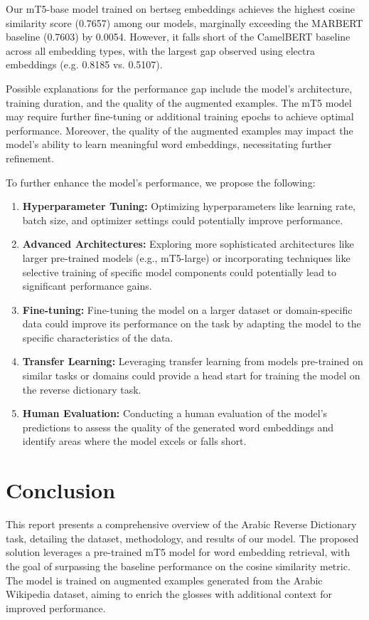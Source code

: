 \documentclass[15pt]{article}
\begin{document}
Our mT5-base model trained on bertseg embeddings achieves the highest cosine similarity score (0.7657) among our models, marginally exceeding the MARBERT baseline (0.7603) by 0.0054. However, it falls short of the CamelBERT baseline across all embedding types, with the largest gap observed using electra embeddings (e.g. 0.8185 vs. 0.5107).

Possible explanations for the performance gap include the model's architecture, training duration, and the quality of the augmented examples. The mT5 model may require further fine-tuning or additional training epochs to achieve optimal performance. Moreover, the quality of the augmented examples may impact the model's ability to learn meaningful word embeddings, necessitating further refinement.

To further enhance the model's performance, we propose the following:
\begin{enumerate}
    \item \textbf{Hyperparameter Tuning:} Optimizing hyperparameters like learning rate, batch size, and optimizer settings could potentially improve performance.
    \item \textbf{Advanced Architectures:} Exploring more sophisticated architectures like larger pre-trained models (e.g., mT5-large) or incorporating techniques like selective training of specific model components could potentially lead to significant performance gains.
    \item \textbf{Fine-tuning:} Fine-tuning the model on a larger dataset or domain-specific data could improve its performance on the task by adapting the model to the specific characteristics of the data.
    \item \textbf{Transfer Learning:} Leveraging transfer learning from models pre-trained on similar tasks or domains could provide a head start for training the model on the reverse dictionary task.
    \item \textbf{Human Evaluation:} Conducting a human evaluation of the model's predictions to assess the quality of the generated word embeddings and identify areas where the model excels or falls short.
\end{enumerate} 

\section*{Conclusion}

This report presents a comprehensive overview of the Arabic Reverse Dictionary task, detailing the dataset, methodology, and results of our model. The proposed solution leverages a pre-trained mT5 model for word embedding retrieval, with the goal of surpassing the baseline performance on the cosine similarity metric. The model is trained on augmented examples generated from the Arabic Wikipedia dataset, aiming to enrich the glosses with additional context for improved performance.
\end{document}

